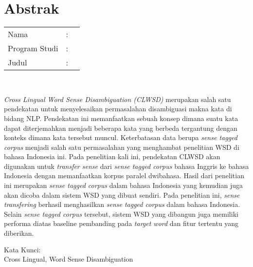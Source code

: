 %
%
%

\chapter*{Abstrak}

\vspace*{0.2cm}

\noindent \begin{tabular}{l l p{10cm}}
	Nama&: & \penulis \\
	Program Studi&: & \program \\
	Judul&: & \judul \\
\end{tabular} \\ 

\vspace*{0.5cm}

\noindent
\textit{Cross Lingual Word Sense Disambiguation (CLWSD)} merupakan salah satu pendekatan untuk menyelesaikan permasalahan disambiguasi makna kata di bidang NLP. Pendekatan ini memanfaatkan sebuah konsep dimana suatu kata dapat diterjemahkan menjadi beberapa kata yang berbeda tergantung dengan konteks dimana kata tersebut muncul. Keterbatasan data berupa \textit{sense tagged corpus} menjadi salah satu permasalahan yang menghambat penelitian WSD di bahasa Indonesia ini. Pada penelitian kali ini, pendekatan CLWSD akan digunakan untuk \textit{transfer sense} dari \textit{sense tagged corpus} bahasa Inggris ke bahasa Indonesia dengan memanfaatkan korpus paralel dwibahasa. Hasil dari penelitian ini merupakan \textit{sense tagged corpus} dalam bahasa Indonesia yang kemudian juga akan dicoba dalam sistem WSD yang dibuat sendiri. Pada penelitian ini, \textit{sense transfering} berhasil menghasilkan \textit{sense tagged corpus} dalam bahasa Indonesia. Selain \textit{sense tagged corpus} tersebut, sistem WSD yang dibangun juga memiliki performa diatas baseline pembanding pada \textit{target word} dan fitur tertentu yang diberikan.


\vspace*{0.2cm}

\noindent Kata Kunci: \\ 
\noindent Cross Lingual, Word Sense Disambiguation

\newpage